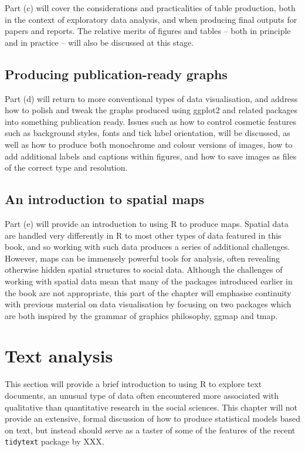 \documentclass[]{book}
\theoremstyle{definition}
\theoremstyle{definition}
\theoremstyle{definition}
\theoremstyle{remark}
\begin{document}
Part (c) will cover the considerations and practicalities of table
production, both in the context of exploratory data analysis, and when
producing final outputs for papers and reports. The relative merits of
figures and tables -- both in principle and in practice -- will also be
discussed at this stage.

\section{Producing publication-ready
graphs}\label{producing-publication-ready-graphs}

Part (d) will return to more conventional types of data visualisation,
and address how to polish and tweak the graphs produced using ggplot2
and related packages into something publication ready. Issues such as
how to control cosmetic features such as background styles, fonts and
tick label orientation, will be discussed, as well as how to produce
both monochrome and colour versions of images, how to add additional
labels and captions within figures, and how to save images as files of
the correct type and resolution.

\section{An introduction to spatial
maps}\label{an-introduction-to-spatial-maps}

Part (e) will provide an introduction to using R to produce maps.
Spatial data are handled very differently in R to most other types of
data featured in this book, and so working with such data produces a
series of additional challenges. However, maps can be immensely powerful
tools for analysis, often revealing otherwise hidden spatial structures
to social data. Although the challenges of working with spatial data
mean that many of the packages introduced earlier in the book are not
appropriate, this part of the chapter will emphasise continuity with
previous material on data visualisation by focusing on two packages
which are both inspired by the grammar of graphics philosophy, ggmap and
tmap.

\chapter{Text analysis}\label{text_explore}

This section will provide a brief introduction to using R to explore
text documents, an unusual type of data often encountered more
associated with qualitative than quantitative research in the social
sciences. This chapter will not provide an extensive, formal discussion
of how to produce statistical models based on text, but instead should
serve as a taster of some of the features of the recent
\texttt{tidytext} package by XXX.
\end{document}
